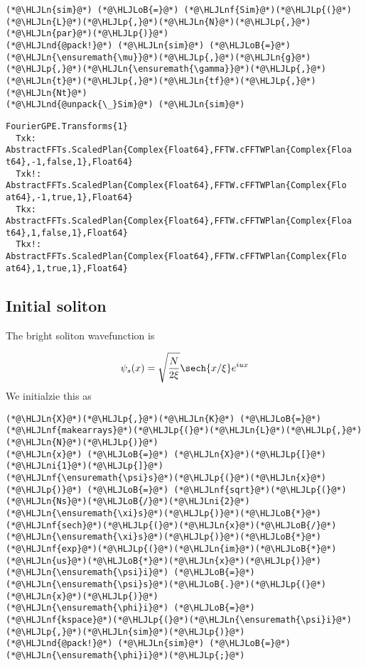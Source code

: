 \documentclass[12pt,a4paper]{article}
\newcommand{\HLJLn}[1]{#1}
\newcommand{\HLJLnd}[1]{\textcolor[RGB]{214,102,97}{#1}}
\newcommand{\HLJLnf}[1]{\textcolor[RGB]{66,102,213}{#1}}
\newcommand{\HLJLni}[1]{\textcolor[RGB]{59,151,46}{#1}}
\newcommand{\HLJLoB}[1]{\textcolor[RGB]{102,102,102}{\textbf{#1}}}
\newcommand{\HLJLp}[1]{#1}
\begin{document}
\begin{lstlisting}
(*@\HLJLn{sim}@*) (*@\HLJLoB{=}@*) (*@\HLJLnf{Sim}@*)(*@\HLJLp{(}@*)(*@\HLJLn{L}@*)(*@\HLJLp{,}@*)(*@\HLJLn{N}@*)(*@\HLJLp{,}@*)(*@\HLJLn{par}@*)(*@\HLJLp{)}@*)
(*@\HLJLnd{@pack!}@*) (*@\HLJLn{sim}@*) (*@\HLJLoB{=}@*) (*@\HLJLn{\ensuremath{\mu}}@*)(*@\HLJLp{,}@*)(*@\HLJLn{g}@*)(*@\HLJLp{,}@*)(*@\HLJLn{\ensuremath{\gamma}}@*)(*@\HLJLp{,}@*)(*@\HLJLn{t}@*)(*@\HLJLp{,}@*)(*@\HLJLn{tf}@*)(*@\HLJLp{,}@*)(*@\HLJLn{Nt}@*)
(*@\HLJLnd{@unpack{\_}Sim}@*) (*@\HLJLn{sim}@*)
\end{lstlisting}

\begin{lstlisting}
FourierGPE.Transforms{1}
  Txk: AbstractFFTs.ScaledPlan{Complex{Float64},FFTW.cFFTWPlan{Complex{Floa
t64},-1,false,1},Float64}
  Txk!: AbstractFFTs.ScaledPlan{Complex{Float64},FFTW.cFFTWPlan{Complex{Flo
at64},-1,true,1},Float64}
  Tkx: AbstractFFTs.ScaledPlan{Complex{Float64},FFTW.cFFTWPlan{Complex{Floa
t64},1,false,1},Float64}
  Tkx!: AbstractFFTs.ScaledPlan{Complex{Float64},FFTW.cFFTWPlan{Complex{Flo
at64},1,true,1},Float64}
\end{lstlisting}


\subsection{Initial soliton}
The bright soliton wavefunction is

\[
\psi_s(x)= \sqrt{\frac{N}{2\xi}}\sech{x/\xi}e^{iux}
\]
We initialzie this as


\begin{lstlisting}
(*@\HLJLn{X}@*)(*@\HLJLp{,}@*)(*@\HLJLn{K}@*) (*@\HLJLoB{=}@*) (*@\HLJLnf{makearrays}@*)(*@\HLJLp{(}@*)(*@\HLJLn{L}@*)(*@\HLJLp{,}@*)(*@\HLJLn{N}@*)(*@\HLJLp{)}@*)
(*@\HLJLn{x}@*) (*@\HLJLoB{=}@*) (*@\HLJLn{X}@*)(*@\HLJLp{[}@*)(*@\HLJLni{1}@*)(*@\HLJLp{]}@*)
(*@\HLJLnf{\ensuremath{\psi}s}@*)(*@\HLJLp{(}@*)(*@\HLJLn{x}@*)(*@\HLJLp{)}@*) (*@\HLJLoB{=}@*) (*@\HLJLnf{sqrt}@*)(*@\HLJLp{(}@*)(*@\HLJLn{Ns}@*)(*@\HLJLoB{/}@*)(*@\HLJLni{2}@*)(*@\HLJLn{\ensuremath{\xi}s}@*)(*@\HLJLp{)}@*)(*@\HLJLoB{*}@*)(*@\HLJLnf{sech}@*)(*@\HLJLp{(}@*)(*@\HLJLn{x}@*)(*@\HLJLoB{/}@*)(*@\HLJLn{\ensuremath{\xi}s}@*)(*@\HLJLp{)}@*)(*@\HLJLoB{*}@*)(*@\HLJLnf{exp}@*)(*@\HLJLp{(}@*)(*@\HLJLn{im}@*)(*@\HLJLoB{*}@*)(*@\HLJLn{us}@*)(*@\HLJLoB{*}@*)(*@\HLJLn{x}@*)(*@\HLJLp{)}@*)
(*@\HLJLn{\ensuremath{\psi}i}@*) (*@\HLJLoB{=}@*) (*@\HLJLn{\ensuremath{\psi}s}@*)(*@\HLJLoB{.}@*)(*@\HLJLp{(}@*)(*@\HLJLn{x}@*)(*@\HLJLp{)}@*)
(*@\HLJLn{\ensuremath{\phi}i}@*) (*@\HLJLoB{=}@*) (*@\HLJLnf{kspace}@*)(*@\HLJLp{(}@*)(*@\HLJLn{\ensuremath{\psi}i}@*)(*@\HLJLp{,}@*)(*@\HLJLn{sim}@*)(*@\HLJLp{)}@*)
(*@\HLJLnd{@pack!}@*) (*@\HLJLn{sim}@*) (*@\HLJLoB{=}@*) (*@\HLJLn{\ensuremath{\phi}i}@*)(*@\HLJLp{;}@*)
\end{lstlisting}
\end{document}
